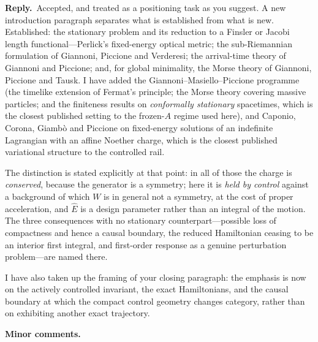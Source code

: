 \documentclass[11pt]{article}
\newcommand{\reply}{\par\noindent\textbf{Reply.}\ }
\newcommand{\R}[1]{\par\medskip\noindent\textbf{#1}\par\nopagebreak}
\begin{document}
\reply Accepted, and treated as a positioning task as you suggest. A new
introduction paragraph separates what is established from what is new.
Established: the stationary problem and its reduction to a Finsler or Jacobi
length functional---Perlick's fixed-energy optical metric; the sub-Riemannian
formulation of Giannoni, Piccione and Verderesi; the arrival-time theory of
Giannoni and Piccione; and, for global minimality, the Morse theory of Giannoni,
Piccione and Tausk. I have added the Giannoni--Masiello--Piccione programme
(the timelike extension of Fermat's principle; the Morse theory covering massive
particles; and the finiteness results on \emph{conformally stationary}
spacetimes, which is the closest published setting to the frozen-$A$ regime used
here), and Caponio, Corona, Giamb\`o and Piccione on fixed-energy solutions of an
indefinite Lagrangian with an affine Noether charge, which is the closest
published variational structure to the controlled rail.

The distinction is stated explicitly at that point: in all of those the charge is
\emph{conserved}, because the generator is a symmetry; here it is \emph{held by
control} against a background of which $W$ is in general not a symmetry, at the
cost of proper acceleration, and $\hat E$ is a design parameter rather than an
integral of the motion. The three consequences with no stationary
counterpart---possible loss of compactness and hence a causal boundary, the
reduced Hamiltonian ceasing to be an interior first integral, and first-order
response as a genuine perturbation problem---are named there.

I have also taken up the framing of your closing paragraph: the emphasis is now
on the actively controlled invariant, the exact Hamiltonians, and the causal
boundary at which the compact control geometry changes category, rather than on
exhibiting another exact trajectory.

\R{Minor comments.}
\end{document}

